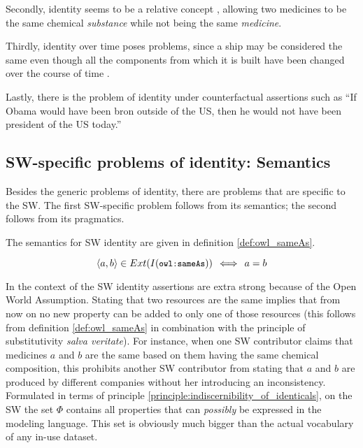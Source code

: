 Secondly, identity seems to be a relative concept \cite{Geach1967},
  allowing two medicines to be the same chemical \emph{substance}
  while not being the same \emph{medicine}.

Thirdly, identity over time poses problems,
  since a ship may be considered the same
  even though all the components from which it is built
  have been changed over the course of time \cite{Lewis1986}.

Lastly, there is the problem of identity under counterfactual assertions
  such as ``If Obama would have been bron outside of the US,
  then he would not have been president of the US today.''\cite{Kripke1980}

\subsection{SW-specific problems of identity: Semantics}

Besides the generic problems of identity,
  there are problems that are specific to the SW.
The first SW-specific problem follows from its semantics;
  the second follows from its pragmatics.

The semantics for SW identity are given in definition \ref{def:owl_sameAs}.

\begin{definition}
\label{def:owl_sameAs}
\begin{equation}
    \langle a, b \rangle \in Ext(I({\small \texttt{owl:sameAs}}))
  \,\iff\,
    a = b\nonumber
\end{equation}
\end{definition}

\noindent In the context of the SW identity assertions are extra strong
  because of the Open World Assumption.
Stating that two resources are the same
  implies that from now on no new property can be added
  to only one of those resources
  (this follows from definition \ref{def:owl_sameAs} in combination with
  the principle of substitutivity \emph{salva veritate}).
For instance, when one SW contributor claims that
  medicines $a$ and $b$ are the same
  based on them having the same chemical composition,
  this prohibits another SW contributor from stating that
  $a$ and $b$ are produced by different companies
  without her introducing an inconsistency.
Formulated in terms of
  principle \ref{principle:indiscernibility_of_identicals},
  on the SW the set $\Phi$ contains
  all properties that can \emph{possibly} be expressed
  in the modeling language.
This set is obviously much bigger than the actual vocabulary
  of any in-use dataset.

